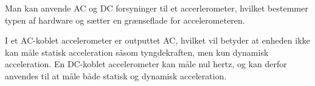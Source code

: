 Man kan anvende AC og DC forsyninger til et accerlerometer, hvilket bestemmer typen af hardware og sætter en grænseflade for accelerometeren. \citep{Engineering}

I et AC-koblet accelerometer er outputtet AC, hvilket vil betyder at enheden ikke kan måle statisk acceleration såsom tyngdekraften, men kun dynamisk acceleration. 
En DC-koblet accelerometer kan måle nul hertz, og kan derfor anvendes til at måle både statisk og dynamisk acceleration. 



